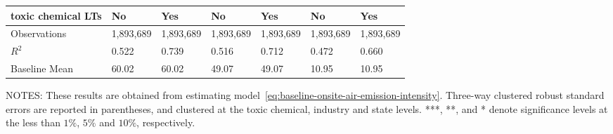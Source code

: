 \begin{table}[H]
{\begin{tabular}{@{}lllllll@{}}
            toxic chemical LTs            & No        & Yes       & No        & Yes       & No        & Yes       \\ \midrule
            Observations                  & 1,893,689 & 1,893,689 & 1,893,689 & 1,893,689 & 1,893,689 & 1,893,689 \\
            $R^2$                         & 0.522     & 0.739     & 0.516     & 0.712     & 0.472     & 0.660     \\
            Baseline Mean                 & 60.02     & 60.02     & 49.07     & 49.07     & 10.95     & 10.95     \\ \bottomrule\bottomrule
        \end{tabular}%
    }
    \begin{minipage}{\columnwidth}
        \vspace{0.05in}
        NOTES: These results are obtained from estimating model~\ref{eq:baseline-onsite-air-emission-intensity}. Three-way clustered robust standard errors are reported in parentheses, and clustered at the toxic chemical, industry and state levels. ***, **, and * denote significance levels at the less than $1\%$, $5\%$ and $10\%$, respectively.
    \end{minipage}
\end{table}
